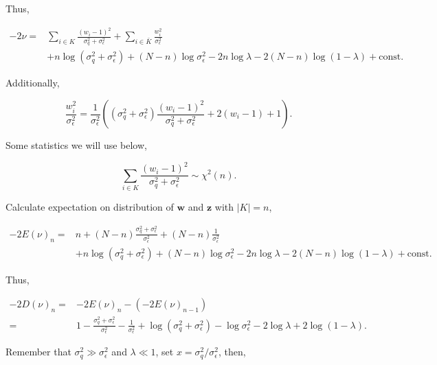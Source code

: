 Thus, 

\begin{equation}
\begin{aligned}
    -2\nu =& \sum_{i\in K}\frac{(w_i - 1)^2}{\sigma_q^2+\sigma_\epsilon^2} + \sum_{i\in \bar{K}}\frac{w_i^2}{\sigma_\epsilon^2} \\ 
    &+ n\log(\sigma_q^2+\sigma_\epsilon^2) + (N-n)\log\sigma_\epsilon^2 - 2n\log\lambda - 2(N-n)\log(1-\lambda) + \mathrm{const}.
\end{aligned}
\end{equation}

Additionally, 

\begin{equation}
    \frac{w_i^2}{\sigma_\epsilon^2} = \frac{1}{\sigma_\epsilon^2}\left((\sigma_q^2+\sigma_\epsilon^2)\frac{(w_i - 1)^2}{\sigma_q^2+\sigma_\epsilon^2} + 2(w_i - 1) + 1\right).
\end{equation}

Some statistics we will use below,

\begin{equation}
    \sum_{i\in K}\frac{(w_i - 1)^2}{\sigma_q^2+\sigma_\epsilon^2} \sim \chi^2(n).
\end{equation}

Calculate expectation on distribution of $\bm{w}$ and $\bm{z}$ with $|K|=n$, 

\begin{equation}
\begin{aligned}
    -2E(\nu)_n =& n + (N - n)\frac{\sigma_q^2+\sigma_\epsilon^2}{\sigma_\epsilon^2} + (N - n)\frac{1}{\sigma_\epsilon^2} \\ 
    &+ n\log(\sigma_q^2+\sigma_\epsilon^2) + (N-n)\log\sigma_\epsilon^2 - 2n\log\lambda - 2(N-n)\log(1-\lambda) + \mathrm{const}.
\end{aligned}
\end{equation}

Thus, 

\begin{equation}
\begin{aligned}
    -2D(\nu)_n =& -2E(\nu)_n - (-2E(\nu)_{n-1}) \\ 
    =& 1 - \frac{\sigma_q^2+\sigma_\epsilon^2}{\sigma_\epsilon^2} - \frac{1}{\sigma_\epsilon^2} + \log(\sigma_q^2+\sigma_\epsilon^2) - \log\sigma_\epsilon^2 - 2\log\lambda + 2\log(1-\lambda).
\end{aligned}
\end{equation}

Remember that $\sigma_q^2 \gg \sigma_\epsilon^2$ and $\lambda \ll 1$, set $x=\sigma_q^2/\sigma_\epsilon^2$, then,

